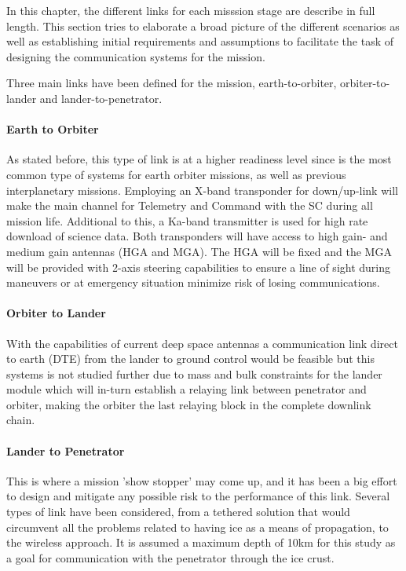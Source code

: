 
In this chapter, the different links for each misssion stage are describe in full length. This section tries to elaborate a broad picture of the different scenarios as well as establishing initial requirements and assumptions to facilitate the task of designing the communication systems for the mission.

Three main links have been defined for the mission, earth-to-orbiter, orbiter-to-lander and lander-to-penetrator.

\paragraph{Earth to Orbiter}
As stated before, this type of link is at a higher readiness level since is the most common type of systems for earth orbiter missions, as well as previous interplanetary missions. Employing an X-band transponder for down/up-link will make the main channel for Telemetry and Command with the SC during all mission life. Additional to this, a Ka-band transmitter is used for high rate download of science data. Both transponders will have access to high gain- and medium gain antennas (HGA and MGA). The HGA will be fixed and the MGA will be provided with 2-axis steering capabilities to ensure a line of sight during maneuvers or at emergency situation minimize risk of losing communications.

\paragraph{Orbiter to Lander}
With the capabilities of current deep space antennas a communication link direct to earth (DTE) from the lander to ground control would be feasible but this systems is not studied further due to mass and bulk constraints for the lander module which will in-turn establish a relaying link between penetrator and orbiter, making the orbiter the last relaying block in the complete downlink chain.

\paragraph{Lander to Penetrator}
This is where a mission 'show stopper' may come up, and it has been a big effort to design and mitigate any possible risk to the performance of this link. Several types of link have been considered, from a tethered solution that would circumvent all the problems related to having ice as a means of propagation, to the wireless approach. It is assumed a maximum depth of 10km for this study as a goal for communication with the penetrator through the ice crust.

